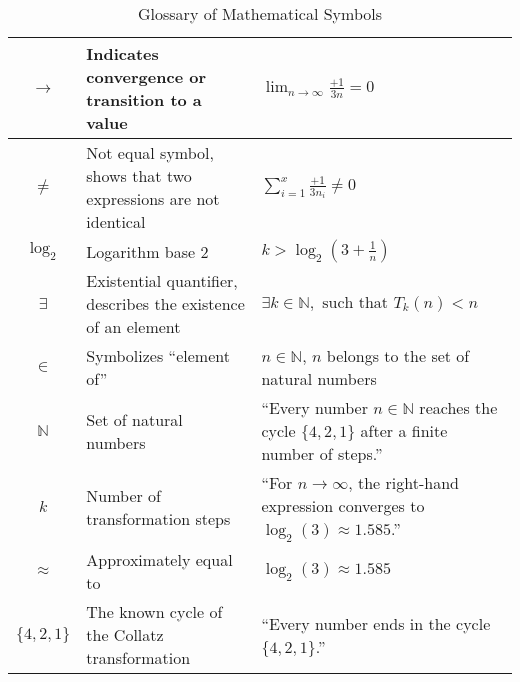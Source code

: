 \documentclass[a4paper,12pt]{article}
\begin{document}
\begin{table}[h!]
\begin{tabular}{|c|p{7cm}|p{5cm}|}
    \( \to \) & Indicates convergence or transition to a value & \( \lim_{n \to \infty} \frac{+1}{3n} = 0 \) \\ \hline
    \( \neq \) & Not equal symbol, shows that two expressions are not identical & \( \sum_{i=1}^x \frac{+1}{3n_i} \neq 0 \) \\ \hline
    \( \log_2 \) & Logarithm base 2 & \( k > \log_2(3 + \frac{1}{n}) \) \\ \hline
    \( \exists \) & Existential quantifier, describes the existence of an element & \( \exists k \in \mathbb{N}, \text{ such that } T_k(n) < n \) \\ \hline
    \( \in \) & Symbolizes “element of” & \( n \in \mathbb{N} \), \( n \) belongs to the set of natural numbers \\ \hline
    \( \mathbb{N} \) & Set of natural numbers & “Every number \( n \in \mathbb{N} \) reaches the cycle \( \{4, 2, 1\} \) after a finite number of steps.” \\ \hline
    \( k \) & Number of transformation steps & “For \( n \to \infty \), the right-hand expression converges to \( \log_2(3) \approx 1.585 \).” \\ \hline
    \( \approx \) & Approximately equal to & \( \log_2(3) \approx 1.585 \) \\ \hline
    \( \{4, 2, 1\} \) & The known cycle of the Collatz transformation & “Every number ends in the cycle \( \{4, 2, 1\} \).” \\ \hline
    \end{tabular}
    \caption{Glossary of Mathematical Symbols}
    \label{tab:glossary}
    \end{table}
    
\end{document}
